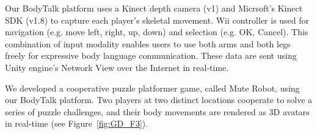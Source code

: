 
Our BodyTalk platform uses a Kinect depth camera (v1) and Micrsoft's Kinect SDK (v1.8) to capture each player's skeletal movement. 
Wii controller is used for navigation (e.g. move left, right, up, down) and selection (e.g. OK, Cancel). 
This combination of input modality enables users to use both arms and both legs freely for expressive body language communication.
These data are sent using Unity engine's\cite{unity} Network View over the Internet in real-time.

We developed a cooperative puzzle platformer game, called Mute Robot, using our BodyTalk platform. Two players at two distinct locations cooperate to solve a series of puzzle challenges, and their body movements are rendered as 3D avatars in real-time (see Figure~\ref{fig:GD_F3}). 



